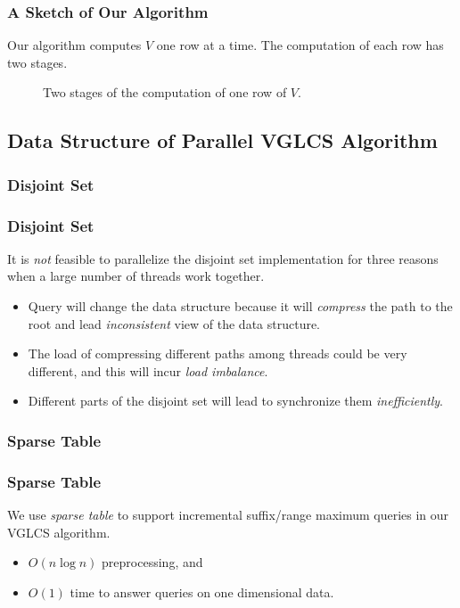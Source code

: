 \begin{frame}
	\frametitle{A Sketch of Our Algorithm}
	Our algorithm computes $V$ one row at a time.  The computation of
	each row has two stages.
	\begin{center}
		\scalebox{.7} { \begin{minipage}{1.2\textwidth}
			\begin{figure}
			  \centering {} 
			  \caption{Two stages of the computation of one row of $V$.}
			  \label{fig:fig-VGLCS-dp-rmq}
			\end{figure}
			\end{minipage}
		}
	\end{center}
\end{frame}

\subsection{Data Structure of Parallel VGLCS Algorithm}
\subsubsection{Disjoint Set}
\begin{frame}
    \frametitle{Disjoint Set}
    It is {\em not} feasible to parallelize the disjoint set
	implementation for three reasons when a large number of threads work
	together.

	\begin{itemize}
		\setlength\itemsep{1em}
		\item
			{\sc Query} will change the data structure because it will
			{\em compress} the path to the root and lead {\em
			inconsistent} view of the data structure.
		\item 
			The load of compressing different paths among threads could
			be very different, and this will incur {\em load imbalance}.
		\item 
			Different parts of the disjoint set will lead to synchronize
			them {\em inefficiently}.
	\end{itemize}
\end{frame}

\subsubsection{Sparse Table}
\begin{frame}
    \frametitle{Sparse Table}
	We use {\em sparse table} to support incremental suffix/range
	maximum queries in our VGLCS algorithm.

	\begin{itemize}
		\setlength\itemsep{1em}
		\item 
			$O(n \log n)$ preprocessing, and 
		\item 
			$O(1)$ time to answer queries on one dimensional data.
	\end{itemize}
\end{frame}

